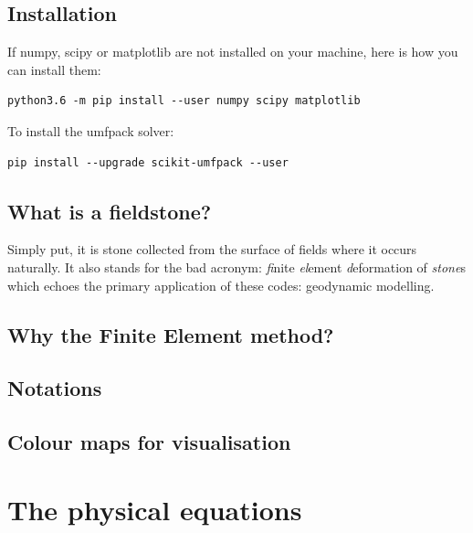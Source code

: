 \documentclass[a4paper]{article}
\begin{document}
\subsection{Installation}

If numpy, scipy or matplotlib are not installed on your machine, here is how you 
can install them:
\begin{verbatim}
python3.6 -m pip install --user numpy scipy matplotlib
\end{verbatim}
To install the umfpack solver:
\begin{verbatim}
pip install --upgrade scikit-umfpack --user
\end{verbatim}


\subsection{What is a fieldstone?} %
Simply put, it is stone collected from the surface of fields where it 
occurs naturally. It also stands for the bad acronym: {\sl fi}nite 
{\sl el}ement {\sl d}eformation of {\sl stone}s which echoes the primary 
application of these codes: geodynamic modelling.

\subsection{Why the Finite Element method?}  %
\subsection{Notations}  %
\subsection{Colour maps for visualisation}  %


\newpage
\section{The physical equations} %
\end{document}
